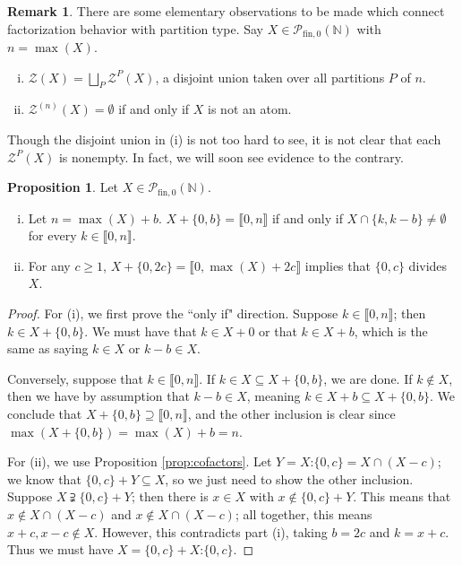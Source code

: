 \documentclass{report}
\newcommand{\NN}{\mathbb{N}}
\renewcommand{\P}{\mathcal{P}}
\newcommand{\Z}{\mathcal{Z}}
\newcommand{\llb}{\llbracket}
\newcommand{\rrb}{\rrbracket}
\newcommand{\fin}{\textrm{fin}}
\renewcommand{\:}{\text{:}}
\newcommand{\PN}{{\P_{\fin,0}(\NN)}}
\theoremstyle{definition}
\newtheorem{prop}[defn]{Proposition}
\newtheorem{rk}[defn]{Remark}
\begin{document}
\begin{rk}
There are some elementary observations to be made which connect factorization behavior with partition type.
Say $X \in \PN$ with $n = \max(X)$.
\begin{enumerate}[(i)]
\item $\Z(X) = \bigsqcup_{P} \Z^P(X)$, a disjoint union taken over all partitions $P$ of $n$.
\item $\Z^{(n)}(X) = \emptyset$ if and only if $X$ is not an atom.
\end{enumerate}
Though the disjoint union in (i) is not too hard to see, it is not clear that each $\Z^P(X)$ is nonempty.
In fact, we will soon see evidence to the contrary.
\end{rk}



\begin{prop} \label{prop:2-elt factor/cofactor}
Let $X\in \PN$.
\begin{enumerate}[(i)]
\item Let $n = \max(X) + b$. $X + \{0,b\} = \llb 0,n \rrb$ if and only if $X \cap \{k,k-b\} \neq \emptyset$ for every $k\in \llb 0,n \rrb$.
\item For any $c\ge 1$, $X + \{0,2c\} = \llb 0,\max(X)+2c \rrb$ implies that $\{0,c\}$ divides $X$.
\end{enumerate}
\end{prop}

\begin{proof}
For (i), we first prove the ``only if" direction.  
Suppose $k\in \llb 0,n \rrb$; then $k\in X + \{0,b\}$.
We must have that $k\in X + 0$ or that $k \in X + b$, which is the same as saying $k\in X$ or $k-b\in X$.

Conversely, suppose that $k\in \llb 0,n \rrb$.
If $k\in X \subseteq X + \{0,b\}$, we are done.
If $k\notin X$, then we have by assumption that $k-b\in X$, meaning $k\in X +b \subseteq X+ \{0,b\}$.
We conclude that $X + \{0,b\} \supseteq \llb 0,n \rrb$, and the other inclusion is clear since $\max(X+\{0,b\}) = \max(X) + b = n$.

For (ii), we use Proposition \ref{prop:cofactors}.
Let $Y = X\:\{0,c\} = X\cap (X-c)$; we know that $\{0,c\} + Y \subseteq X$, so we just need to show the other inclusion.
Suppose $X \supsetneqq \{0,c\} + Y$; then there is $x\in X$ with $x\notin \{0,c\} + Y$.
This means that $x\notin X \cap (X-c)$ and $x \notin X \cap (X-c)$; all together, this means $x+c,x-c\notin X$.
However, this contradicts part (i), taking $b = 2c$ and $k = x+c$.
Thus we must have $X = \{0,c\} + X\:\{0,c\}$.
\end{proof}
\end{document}
